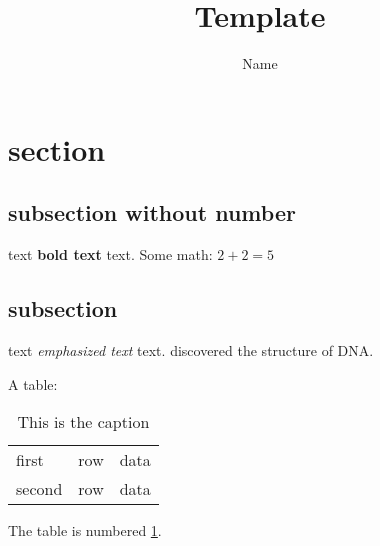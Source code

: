 \documentclass[11pt]{article}
\title{Template}
\author{Name}
\begin{document}
\maketitle

\section{section}
\subsection*{subsection without number}
text \textbf{bold text} text. Some math: $2+2=5$
\subsection{subsection}
text \emph{emphasized text} text. \cite{WC:1953}
discovered the structure of DNA.

A table:
\begin{table}[!th]
\begin{tabular}{|l|c|r|}
\hline
		first  &  row  &  data \\
		second &  row  &  data \\
\hline
\end{tabular}

\caption{This is the caption}
\label{ex:table}
\end{table}

The table is numbered \ref{ex:table}.
\end{document}
